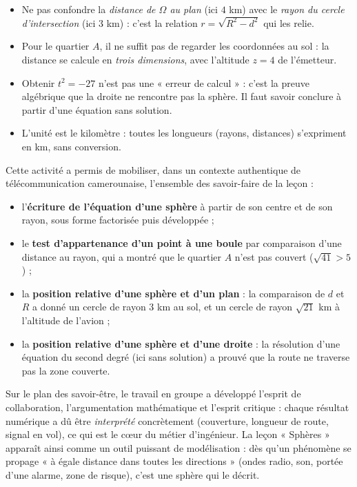 \documentclass[11pt]{article}
\newcounter{popsec}
\newcounter{popsub}
\newcommand{\courssub}[1]{%
  \stepcounter{popsub}%
  \par\vspace{9pt}\noindent{\popxbold\fontsize{11.5}{13}\selectfont\color{popink}{\color{poporange}\thepopsec.\thepopsub}\hspace{6pt}#1}\par\nopagebreak\vspace{4pt}
}
\begin{document}
\begin{attention}
\begin{itemize}
\item Ne pas confondre la \emph{distance de $\Omega$ au plan} (ici $4$ km) avec le \emph{rayon du cercle d'intersection} (ici $3$ km) : c'est la relation $r=\sqrt{R^{2}-d^{2}}$ qui les relie.
\item Pour le quartier $A$, il ne suffit pas de regarder les coordonnées au sol : la distance se calcule en \emph{trois dimensions}, avec l'altitude $z=4$ de l'émetteur.
\item Obtenir $t^{2}=-27$ n'est pas une « erreur de calcul » : c'est la preuve algébrique que la droite ne rencontre pas la sphère. Il faut savoir conclure à partir d'une équation sans solution.
\item L'unité est le kilomètre : toutes les longueurs (rayons, distances) s'expriment en km, sans conversion.
\end{itemize}
\end{attention}

\courssub{Bilan de l'activité}

Cette activité a permis de mobiliser, dans un contexte authentique de télécommunication camerounaise, l'ensemble des savoir-faire de la leçon :

\begin{itemize}
\item l'\textbf{écriture de l'équation d'une sphère} à partir de son centre et de son rayon, sous forme factorisée puis développée ;
\item le \textbf{test d'appartenance d'un point à une boule} par comparaison d'une distance au rayon, qui a montré que le quartier $A$ n'est pas couvert ($\sqrt{41}>5$) ;
\item la \textbf{position relative d'une sphère et d'un plan} : la comparaison de $d$ et $R$ a donné un cercle de rayon $3$ km au sol, et un cercle de rayon $\sqrt{21}$ km à l'altitude de l'avion ;
\item la \textbf{position relative d'une sphère et d'une droite} : la résolution d'une équation du second degré (ici sans solution) a prouvé que la route ne traverse pas la zone couverte.
\end{itemize}

Sur le plan des savoir-être, le travail en groupe a développé l'esprit de collaboration, l'argumentation mathématique et l'esprit critique : chaque résultat numérique a dû être \emph{interprété} concrètement (couverture, longueur de route, signal en vol), ce qui est le cœur du métier d'ingénieur. La leçon « Sphères » apparaît ainsi comme un outil puissant de modélisation : dès qu'un phénomène se propage « à égale distance dans toutes les directions » (ondes radio, son, portée d'une alarme, zone de risque), c'est une sphère qui le décrit.
\end{document}
